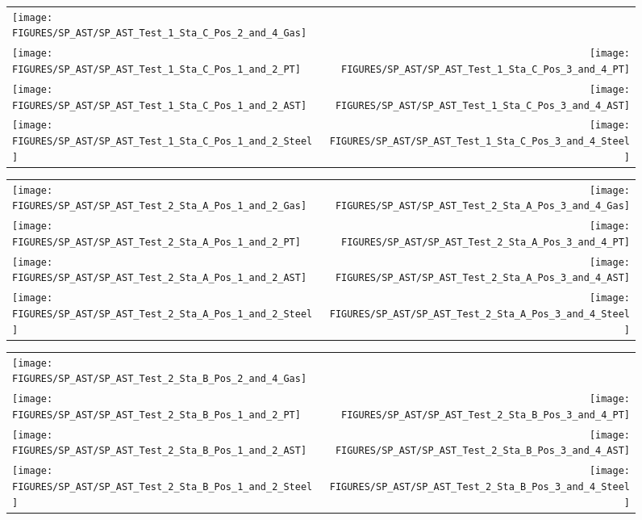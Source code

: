 \begin{figure}[p]
\begin{tabular*}{\textwidth}{l@{\extracolsep{\fill}}r}
\texttt{[image: FIGURES/SP\_AST/SP\_AST\_Test\_1\_Sta\_C\_Pos\_2\_and\_4\_Gas]} &
  \\
\texttt{[image: FIGURES/SP\_AST/SP\_AST\_Test\_1\_Sta\_C\_Pos\_1\_and\_2\_PT]} &
\texttt{[image: FIGURES/SP\_AST/SP\_AST\_Test\_1\_Sta\_C\_Pos\_3\_and\_4\_PT]} \\
\texttt{[image: FIGURES/SP\_AST/SP\_AST\_Test\_1\_Sta\_C\_Pos\_1\_and\_2\_AST]} &
\texttt{[image: FIGURES/SP\_AST/SP\_AST\_Test\_1\_Sta\_C\_Pos\_3\_and\_4\_AST]} \\
\texttt{[image: FIGURES/SP\_AST/SP\_AST\_Test\_1\_Sta\_C\_Pos\_1\_and\_2\_Steel]} &
\texttt{[image: FIGURES/SP\_AST/SP\_AST\_Test\_1\_Sta\_C\_Pos\_3\_and\_4\_Steel]}
\end{tabular*}
\label{SP_Test_1_Station_C}
\end{figure}


\begin{figure}[p]
\begin{tabular*}{\textwidth}{l@{\extracolsep{\fill}}r}
\texttt{[image: FIGURES/SP\_AST/SP\_AST\_Test\_2\_Sta\_A\_Pos\_1\_and\_2\_Gas]} &
\texttt{[image: FIGURES/SP\_AST/SP\_AST\_Test\_2\_Sta\_A\_Pos\_3\_and\_4\_Gas]} \\
\texttt{[image: FIGURES/SP\_AST/SP\_AST\_Test\_2\_Sta\_A\_Pos\_1\_and\_2\_PT]} &
\texttt{[image: FIGURES/SP\_AST/SP\_AST\_Test\_2\_Sta\_A\_Pos\_3\_and\_4\_PT]} \\
\texttt{[image: FIGURES/SP\_AST/SP\_AST\_Test\_2\_Sta\_A\_Pos\_1\_and\_2\_AST]} &
\texttt{[image: FIGURES/SP\_AST/SP\_AST\_Test\_2\_Sta\_A\_Pos\_3\_and\_4\_AST]} \\
\texttt{[image: FIGURES/SP\_AST/SP\_AST\_Test\_2\_Sta\_A\_Pos\_1\_and\_2\_Steel]} &
\texttt{[image: FIGURES/SP\_AST/SP\_AST\_Test\_2\_Sta\_A\_Pos\_3\_and\_4\_Steel]}
\end{tabular*}
\label{SP_Test_2_Station_A}
\end{figure}

\begin{figure}[p]
\begin{tabular*}{\textwidth}{l@{\extracolsep{\fill}}r}
\texttt{[image: FIGURES/SP\_AST/SP\_AST\_Test\_2\_Sta\_B\_Pos\_2\_and\_4\_Gas]} &
  \\
\texttt{[image: FIGURES/SP\_AST/SP\_AST\_Test\_2\_Sta\_B\_Pos\_1\_and\_2\_PT]} &
\texttt{[image: FIGURES/SP\_AST/SP\_AST\_Test\_2\_Sta\_B\_Pos\_3\_and\_4\_PT]} \\
\texttt{[image: FIGURES/SP\_AST/SP\_AST\_Test\_2\_Sta\_B\_Pos\_1\_and\_2\_AST]} &
\texttt{[image: FIGURES/SP\_AST/SP\_AST\_Test\_2\_Sta\_B\_Pos\_3\_and\_4\_AST]} \\
\texttt{[image: FIGURES/SP\_AST/SP\_AST\_Test\_2\_Sta\_B\_Pos\_1\_and\_2\_Steel]} &
\texttt{[image: FIGURES/SP\_AST/SP\_AST\_Test\_2\_Sta\_B\_Pos\_3\_and\_4\_Steel]}
\end{tabular*}
\label{SP_Test_2_Station_B}
\end{figure}

